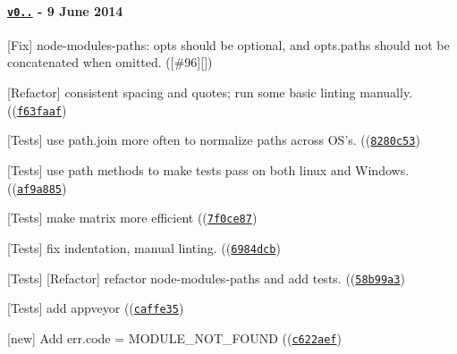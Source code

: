 \paragraph*{\href{https://github.com/browserify/resolve/compare/v0.7.0...v0.7.1}{\tt v0..} -\/ 9 June 2014}


\begin{DoxyItemize}
\item \mbox{[}Fix\mbox{]} {\ttfamily node-\/modules-\/paths}\+: {\ttfamily opts} should be optional, and {\ttfamily opts.\+paths} should not be concatenated when omitted. (\mbox{[}{\ttfamily \#96}\mbox{]}\mbox{[}\mbox{]})
\item \mbox{[}Refactor\mbox{]} consistent spacing and quotes; run some basic linting manually. ((\href{https://github.com/browserify/resolve/commit/f63faaf9df5dbd8da388c674de0b14e3286e5e91}{\tt {\ttfamily f63faaf}})
\item \mbox{[}Tests\mbox{]} use {\ttfamily path.\+join} more often to normalize paths across O\+S’s. ((\href{https://github.com/browserify/resolve/commit/8280c53eae6b612f586e133052ed2b2a56ae6649}{\tt {\ttfamily 8280c53}})
\item \mbox{[}Tests\mbox{]} use {\ttfamily path} methods to make tests pass on both linux and Windows. ((\href{https://github.com/browserify/resolve/commit/af9a8858a618ab64dd4bb311ef1be37822ade2b7}{\tt {\ttfamily af9a885}})
\item \mbox{[}Tests\mbox{]} make matrix more efficient ((\href{https://github.com/browserify/resolve/commit/7f0ce871b6d2b5cb2082b04cd72ddd4055cb7a05}{\tt {\ttfamily 7f0ce87}})
\item \mbox{[}Tests\mbox{]} fix indentation, manual linting. ((\href{https://github.com/browserify/resolve/commit/6984dcb1407fec6af46f744ad2c63f502645bdd6}{\tt {\ttfamily 6984dcb}})
\item \mbox{[}Tests\mbox{]} \mbox{[}Refactor\mbox{]} refactor {\ttfamily node-\/modules-\/paths} and add tests. ((\href{https://github.com/browserify/resolve/commit/58b99a36f882d7ee65df725224f204abd27379db}{\tt {\ttfamily 58b99a3}})
\item \mbox{[}Tests\mbox{]} add {\ttfamily appveyor} ((\href{https://github.com/browserify/resolve/commit/caffe358566bb3c2f9b4cbd8c0f910debfb6df3b}{\tt {\ttfamily caffe35}})
\item \mbox{[}new\mbox{]} Add err.\+code = \textquotesingle{}M\+O\+D\+U\+L\+E\+\_\+\+N\+O\+T\+\_\+\+F\+O\+U\+ND\textquotesingle{} ((\href{https://github.com/browserify/resolve/commit/c622aefeb286e479d536601e30bb828e69f86ec3}{\tt {\ttfamily c622aef}})

\end{DoxyItemize}

